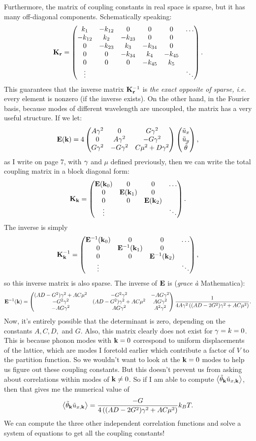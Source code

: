 \documentclass[12pt]{article}
\begin{document}
Furthermore, the matrix of coupling constants in real space is sparse, but it has many off-diagonal components. Schematically speaking:
\[ \mathbf{K}_{\mathbf{r}} = \left(\begin{matrix} k_1 & - k_{12} & 0 & 0 & 0 & \ldots \\ -k_{12} & k_2 & -k_{23} & 0 & 0 & \\ 0 & -k_{23} & k_3 & -k_{34} & 0 & \\ 0 & 0 & -k_{34} & k_4 & -k_{45} & \\ 0 & 0 & 0 & -k_{45} & k_5 & \\ \vdots & & & & & \ddots \end{matrix}\right).\]
This guarantees that the inverse matrix $\mathbf{K}_{\mathbf{r}}^{-1}$ is \emph{the exact opposite of sparse, i.e.} every element is nonzero (if the inverse exists). On the other hand, in the Fourier basis, because modes of different wavelength are uncoupled, the matrix has a very useful structure. If we let:
\[ \mathbf{E}(\mathbf{k}) = 4\left(\begin{matrix}A\gamma^2 & 0 & G\gamma^2 \\ 0 & A\gamma^2 & -G\gamma^2 \\ G \gamma^2 & - G\gamma^2 & C\mu^2 + D\gamma^2\end{matrix}\right)\left(\begin{matrix}\tilde u_x \\ \tilde u_y \\ \tilde {\theta}\end{matrix}\right),\]
as I write on page 7, with $\gamma$ and $\mu$ defined previously, then we can write the total coupling matrix in a block diagonal form:
\[ \mathbf{K}_{\mathbf{k}} = \left(\begin{matrix}\mathbf{E}(\mathbf{k}_0) & 0 & 0 & \ldots \\ 0 & \mathbf{E}(\mathbf{k}_1) & 0 & \\ 0 & 0 & \mathbf{E}(\mathbf{k}_2) & \\ \vdots & & & \ddots\end{matrix}\right).\]
The inverse is simply
\[ \mathbf{K}^{-1}_{\mathbf{k}} = \left(\begin{matrix}\mathbf{E}^{-1}(\mathbf{k}_0) & 0 & 0 & \ldots \\ 0 & \mathbf{E}^{-1}(\mathbf{k}_1) & 0 & \\ 0 & 0 & \mathbf{E}^{-1}(\mathbf{k}_2) & \\ \vdots & & & \ddots\end{matrix}\right),\]
so this inverse matrix is also sparse. The inverse of $\mathbf{E}$ is (\emph{grace \`{a}} Mathematica):
\[\mathbf{E}^{-1}(\mathbf{k}) =  \left(\begin{matrix}(AD-G^2)\gamma^2 + A C\mu^2 & -G^2 \gamma^2 & -A G \gamma^2 \\ -G^2 \gamma^2 & (AD-G^2)\gamma^2 + AC \mu^2 & AG\gamma^2 \\ -A G\gamma^2 & AG \gamma^2 & A^2 \gamma^2\end{matrix}\right)\frac{1}{4A\gamma^2\left((AD-2G^2)\gamma^2 + A C \mu^2\right)}.\]
Now, it's entirely possible that the determinant is zero, depending on the constants $A,C,D,$ and $G$. Also, this matrix clearly does not exist for $\gamma=k = 0$. This is because phonon modes with $\mathbf{k} = 0$ correspond to uniform displacements of the lattice, which are modes I foretold earlier which contribute a factor of $V$ to the partition function. So we wouldn't want to look at the $\mathbf{k}  =  0$ modes to help us figure out these coupling constants. But this doesn't prevent us from asking about correlations within modes of $\mathbf{k} \neq 0$. So if I am able to compute $\left \langle \tilde {\theta}_{\mathbf{k}} \tilde u_{x,\mathbf{k}} \right \rangle$, then that gives me the numerical value of
\[ \left \langle \tilde {\theta}_{\mathbf{k}} \tilde u_{x,\mathbf{k}} \right \rangle = \frac{-G}{4\left((AD-2G^2)\gamma^2 + AC\mu^2\right)}k_BT.\]
We can compute the three other independent correlation functions and solve a system of equations to get all the coupling constants!



\end{document}
